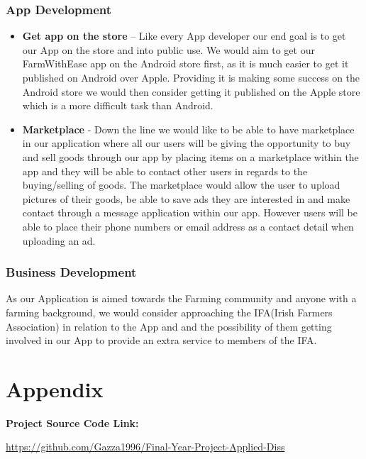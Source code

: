 \documentclass[12pt,a4paper,oneside,openany]{book}
\begin{document}
\subsection{App Development}
\begin{itemize}
    \item \textbf{Get app on the store} – Like every App developer our end goal is to get our App on the store and into public use. We would aim to get our FarmWithEase app on the Android store ﬁrst, as it is much easier to get it published on Android over Apple. Providing it is making some success on the Android store we would then consider getting it published on the Apple store which is a more difficult task than Android.
    
    \item \textbf{Marketplace} - Down the line we would like to be able to have marketplace in our application where all our users will be giving the opportunity to buy and sell goods through our app by placing items on a marketplace within the app and they will be able to contact other users in regards to the buying/selling of goods. The marketplace would allow the user to upload pictures of their goods, be able to save ads they are interested in and make contact through a message application within our app. However users will be able to place their phone numbers or email address as a contact detail when uploading an ad.
    
\end{itemize}

\subsection{Business Development}
As our Application is aimed towards the Farming community and anyone with a farming background, we would consider approaching the IFA(Irish Farmers Association) in relation to the App and and the possibility of them getting involved in our App to provide an extra service to members of the IFA.

\chapter{Appendix}

\textbf{Project Source Code Link:} \\
\item \href{https://github.com/Gazza1996/Final-Year-Project-Applied-Diss}{https://github.com/Gazza1996/Final-Year-Project-Applied-Diss} 




\nocite{*}
\end{document}
